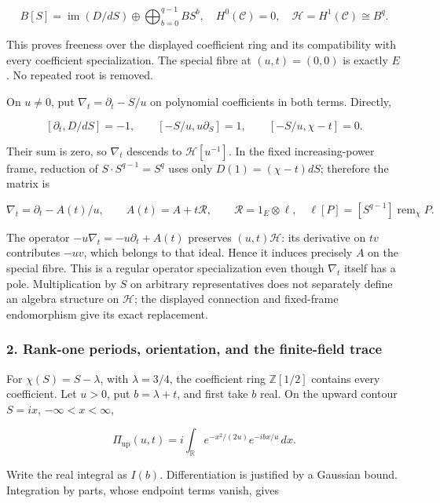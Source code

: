 \[
B[S]=\operatorname{im}(D/dS)\oplus
 \bigoplus_{b=0}^{q-1}B S^b,
\quad H^0(\mathcal C)=0,
\quad \mathcal H=H^1(\mathcal C)\cong B^q.
\tag{DP.3}
\]

This proves freeness over the displayed coefficient ring and its compatibility with every coefficient specialization. The special fibre at \((u,t)=(0,0)\) is exactly \(E\). No repeated root is removed.

On \(u\ne0\), put \(\nabla_t=\partial_t-S/u\) on polynomial coefficients in both terms. Directly,

\[
[\partial_t,D/dS]=-1,
\qquad [-S/u,u\partial_S]=1,
\qquad [-S/u,\chi-t]=0.
\]

Their sum is zero, so \(\nabla_t\) descends to \(\mathcal H[u^{-1}]\). In the fixed increasing-power frame, reduction of \(S\cdot S^{q-1}=S^q\) uses only \(D(1)=(\chi-t)dS\); therefore the matrix is

\[
\nabla_t=\partial_t-A(t)/u,
\qquad A(t)=A+t\mathcal R,
\qquad \mathcal R=1_E\otimes\ell,
\quad \ell[P]=[S^{q-1}]\operatorname{rem}_{\chi}P.
\tag{DP.4}
\]

The operator \(-u\nabla_t=-u\partial_t+A(t)\) preserves \((u,t)\mathcal H\): its derivative on \(tv\) contributes \(-uv\), which belongs to that ideal. Hence it induces precisely \(A\) on the special fibre. This is a regular operator specialization even though \(\nabla_t\) itself has a pole. Multiplication by \(S\) on arbitrary representatives does not separately define an algebra structure on \(\mathcal H\); the displayed connection and fixed-frame endomorphism give its exact replacement.

\subsubsection{2. Rank-one periods, orientation, and the finite-field trace}\label{endpoint-purity_review--rank-one-periods-orientation-and-the-finite-field-trace}

For \(\chi(S)=S-\lambda\), with \(\lambda=3/4\), the coefficient ring \(\mathbb Z[1/2]\) contains every coefficient. Let \(u>0\), put \(b=\lambda+t\), and first take \(b\) real. On the upward contour \(S=ix\), \(-\infty<x<\infty\),

\[
\Pi_{\mathrm{up}}(u,t)
=i\int_{\mathbb R}e^{-x^2/(2u)}e^{-ibx/u}\,dx.
\tag{DP.5}
\]

Write the real integral as \(I(b)\). Differentiation is justified by a Gaussian bound. Integration by parts, whose endpoint terms vanish, gives

